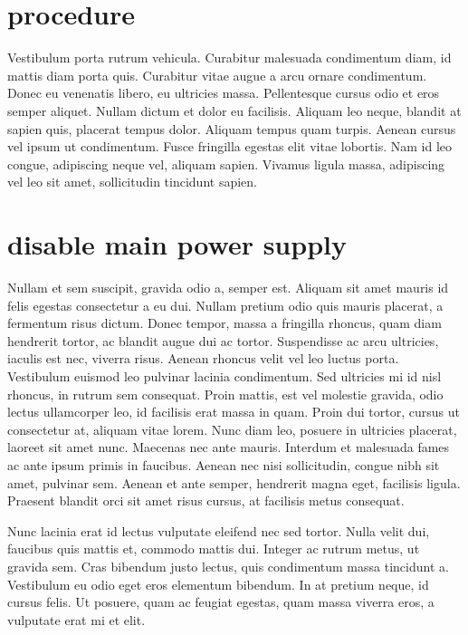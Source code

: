 \documentclass[11pt,a4paper,english]{report}
\begin{document}
\section{procedure}

\par Vestibulum porta rutrum vehicula. Curabitur malesuada condimentum diam, id mattis diam porta quis. Curabitur vitae augue a arcu ornare condimentum. Donec eu venenatis libero, eu ultricies massa. Pellentesque cursus odio et eros semper aliquet. Nullam dictum et dolor eu facilisis. Aliquam leo neque, blandit at sapien quis, placerat tempus dolor. Aliquam tempus quam turpis. Aenean cursus vel ipsum ut condimentum. Fusce fringilla egestas elit vitae lobortis. Nam id leo congue, adipiscing neque vel, aliquam sapien. Vivamus ligula massa, adipiscing vel leo sit amet, sollicitudin tincidunt sapien.

\section{disable main power supply}
\par Nullam et sem suscipit, gravida odio a, semper est. Aliquam sit amet mauris id felis egestas consectetur a eu dui. Nullam pretium odio quis mauris placerat, a fermentum risus dictum. Donec tempor, massa a fringilla rhoncus, quam diam hendrerit tortor, ac blandit augue dui ac tortor. Suspendisse ac arcu ultricies, iaculis est nec, viverra risus. Aenean rhoncus velit vel leo luctus porta. Vestibulum euismod leo pulvinar lacinia condimentum. Sed ultricies mi id nisl rhoncus, in rutrum sem consequat. Proin mattis, est vel molestie gravida, odio lectus ullamcorper leo, id facilisis erat massa in quam. Proin dui tortor, cursus ut consectetur at, aliquam vitae lorem. Nunc diam leo, posuere in ultricies placerat, laoreet sit amet nunc. Maecenas nec ante mauris. Interdum et malesuada fames ac ante ipsum primis in faucibus. Aenean nec nisi sollicitudin, congue nibh sit amet, pulvinar sem. Aenean et ante semper, hendrerit magna eget, facilisis ligula. Praesent blandit orci sit amet risus cursus, at facilisis metus consequat.

\par Nunc lacinia erat id lectus vulputate eleifend nec sed tortor. Nulla velit dui, faucibus quis mattis et, commodo mattis dui. Integer ac rutrum metus, ut gravida sem. Cras bibendum justo lectus, quis condimentum massa tincidunt a. Vestibulum eu odio eget eros elementum bibendum. In at pretium neque, id cursus felis. Ut posuere, quam ac feugiat egestas, quam massa viverra eros, a vulputate erat mi et elit. 
\end{document}
